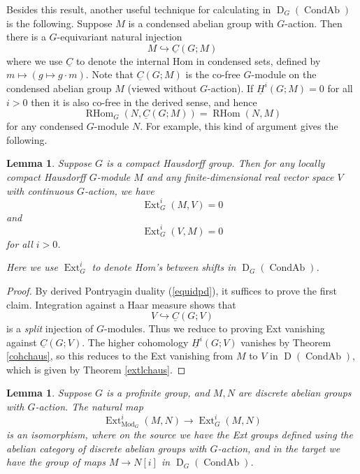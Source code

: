 \documentclass[12pt]{article}
\newtheorem{lemma}[theorem]{Lemma}
\theoremstyle{definition}
\newcommand{\on}{\operatorname}
\newcommand{\ul}{\underline}
\begin{document}
Besides this result, another useful technique for calculating in $\on{D}_G(\on{CondAb})$ is the following. Suppose $M$ is a condensed abelian group with $G$-action.  Then there is a $G$-equivariant natural injection
$$M \hookrightarrow \ul{C}(G;M)$$
where we use $\ul{C}$ to denote the internal Hom in condensed sets, defined by $m\mapsto (g\mapsto g\cdot m)$.  Note that $\ul{C}(G;M)$ is the co-free $G$-module on the condensed abelian group $M$ (viewed without $G$-action).  If $\ul{H}^i(G;M)=0$ for all $i>0$ then it is also co-free in the derived sense, and hence 
$$\on{RHom}_G(N,\ul{C}(G;M)) = \on{RHom}(N,M)$$
for any condensed $G$-module $N$.  For example, this kind of argument gives the following.

\begin{lemma}\label{extagainstrvs}
Suppose $G$ is a compact Hausdorff group.  Then for any locally compact Hausdorff $G$-module $M$ and any finite-dimensional real vector space $V$ with continuous $G$-action, we have
$$\on{Ext}_G^i(M,V)=0$$
and 
$$\on{Ext}_G^i(V,M)=0$$
for all $i>0$.

Here we use $\on{Ext}_G^i$ to denote Hom's between shifts in $\on{D}_G(\on{CondAb})$.
\end{lemma}
\begin{proof}
By derived Pontryagin duality (\ref{equidpd}), it suffices to prove the first claim.  Integration against a Haar measure shows that
$$V\hookrightarrow \ul{C}(G;V)$$
is a \emph{split} injection of $G$-modules.  Thus we reduce to proving Ext vanishing against $\ul{C}(G;V)$.  The higher cohomology $\ul{H}^i(G;V)$ vanishes by Theorem \ref{cohchaus}, so this reduces to the Ext vanishing from $M$ to $V$ in $\on{D}(\on{CondAb})$, which is given by Theorem \ref{extlchaus}.
\end{proof}

\begin{lemma}\label{compareexts}
Suppose $G$ is a profinite group, and $M,N$ are discrete abelian groups with $G$-action.  The natural map
$$\on{Ext}^i_{\on{Mod}_G}(M,N) \to \on{Ext}^i_G(M,N)$$
is an isomorphism, where on the source we have the Ext groups defined using the abelian category of discrete abelian groups with $G$-action, and in the target we have the group of maps $M \to N[i]$ in $\on{D}_G(\on{CondAb})$.
\end{lemma}
\end{document}
